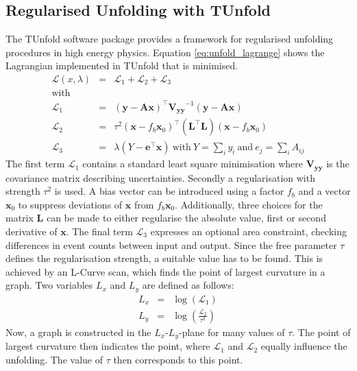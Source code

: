 \subsection{Regularised Unfolding with TUnfold}
	The TUnfold software package \cite{tunfold} provides a framework for regularised unfolding procedures in high energy physics. Equation \ref{eq:unfold_lagrange} shows the Lagrangian implemented in TUnfold that is minimised.
	\begin{eqnarray}
	\label{eq:unfold_lagrange}
	\mathcal{L}(x,\lambda) &=& \mathcal{L}_1 + \mathcal{L}_2 + \mathcal{L}_3 
	\\ \nonumber \text{with}
	\\ 
	\label{eq:unfold_lagrange1}
	\mathcal{L}_1 &=& (\mathbf{y} - \mathbf{Ax})^\intercal \mathbf{V_{yy}}^{-1} (\mathbf{y} - \mathbf{Ax}) 
	\\
	\label{eq:unfold_lagrange2}
	\mathcal{L}_2 &=& \tau^2 (\mathbf{x} - f_b \mathbf{x}_0)^\intercal (\mathbf{L}^\intercal \mathbf{L}) (\mathbf{x} - f_b \mathbf{x}_0) 
	\\
	\label{eq:unfold_lagrange3}
	\mathcal{L}_3 &=& \lambda (Y-\mathbf{e}^\intercal \mathbf{x}) \ \text{with} \ Y=\sum_{i} y_i \ \text{and} \ e_j = \sum_{i}A_{ij}
	\end{eqnarray}
	The first term $\mathcal{L}_1$ contains a standard least square minimisation where $\mathbf{V_{yy}}$ is the covariance matrix describing uncertainties. Secondly a regularisation with strength $\tau^2$ is used. A bias vector can be introduced using a factor $f_b$ and a vector $\mathbf{x}_0$ to suppress deviations of $\mathbf{x}$ from $f_b\mathbf{x}_0$. Additionally, three choices for the matrix $\mathbf{L}$ can be made to either regularise the absolute value, first or second derivative of $\mathbf{x}$. The final term $\mathcal{L}_3$ expresses an optional area constraint, checking differences in event counts between input and output. Since the free parameter $\tau$ defines the regularisation strength, a suitable value has to be found. This is achieved by an L-Curve scan, which finds the point of largest curvature in a graph. Two variables $L_x$ and $L_y$ are defined as follows:
	\begin{eqnarray}
	L_x  &=& \log \left(  \mathcal{L}_1 \right) \\
	L_y  &=& \log \left(  \frac{\mathcal{L}_2}{\tau^2} \right)
	\end{eqnarray}
	Now, a graph is constructed in the $L_x$-$L_y$-plane for many values of $\tau$. The point of largest curvature then indicates the point, where $\mathcal{L}_1$ and $\mathcal{L}_2$ equally influence the unfolding. The value of $\tau$ then corresponds to this point. 
	
